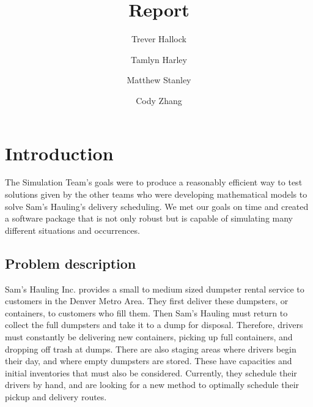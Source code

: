 \documentclass{article}
\title{Report}
\author{
	Trever Hallock \and
	Tamlyn Harley \and
	Matthew Stanley \and
	Cody Zhang
}
\makeatletter
\newcommand{\verbatimfont}[1]{\renewcommand{\verbatim@font}{\ttfamily#1}}
\makeatother
\begin{document}
\verbatimfont{\small}%

\maketitle


\clearpage
\tableofcontents
\clearpage


\section{Introduction}

The Simulation Team's goals were to produce a reasonably efficient way to test solutions given by the other teams who were developing mathematical models to solve Sam's Hauling's delivery scheduling.
We met our goals on time and created a software package that is not only robust but is capable of simulating many different situations and occurrences.

\subsection{Problem description}

Sam’s Hauling Inc. provides a small to medium sized dumpster rental service to customers in the Denver Metro Area.
They first deliver these dumpsters, or containers, to customers who fill them. Then Sam’s Hauling must return to collect the full dumpsters and take it to a dump for disposal.
Therefore, drivers must constantly be delivering new containers, picking up full containers, and dropping off trash at dumps.
There are also staging areas where drivers begin their day, and where empty dumpsters are stored.
These have capacities and initial inventories that must also be considered.
Currently, they schedule their drivers by hand, and are looking for a new method to optimally schedule their pickup and delivery routes.
\end{document}
